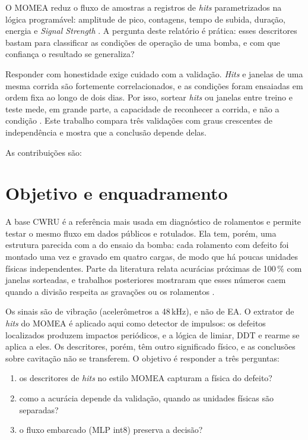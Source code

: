\documentclass[12pt]{article}
\begin{document}
O MOMEA reduz o fluxo de amostras a registros de \textit{hits} parametrizados na lógica programável: amplitude de pico, contagens, tempo de subida, duração, energia e \textit{Signal Strength} \cite{unnthorsson2013,vallen2022}. A pergunta deste relatório é prática: esses descritores bastam para classificar as condições de operação de uma bomba, e com que confiança o resultado se generaliza?

Responder com honestidade exige cuidado com a validação. \textit{Hits} e janelas de uma mesma corrida são fortemente correlacionados, e as condições foram ensaiadas em ordem fixa ao longo de dois dias. Por isso, sortear \textit{hits} ou janelas entre treino e teste mede, em grande parte, a capacidade de reconhecer a corrida, e não a condição \cite{kaufman2012,roberts2017}. Este trabalho compara três validações com graus crescentes de independência e mostra que a conclusão depende delas.

As contribuições são:

\section{Objetivo e enquadramento}
\label{sec:objetivo}


A base CWRU \cite{cwru} é a referência mais usada em diagnóstico de rolamentos e permite testar o mesmo fluxo em dados públicos e rotulados. Ela tem, porém, uma estrutura parecida com a do ensaio da bomba: cada rolamento com defeito foi montado uma vez e gravado em quatro cargas, de modo que há poucas unidades físicas independentes. Parte da literatura relata acurácias próximas de 100\,\% com janelas sorteadas, e trabalhos posteriores mostraram que esses números caem quando a divisão respeita as gravações ou os rolamentos \cite{smith2015,rauber2021,hendriks2022}.

Os sinais são de vibração (acelerômetros a 48\,kHz), e não de EA. O extrator de \textit{hits} do MOMEA é aplicado aqui como detector de impulsos: os defeitos localizados produzem impactos periódicos, e a lógica de limiar, DDT e rearme se aplica a eles. Os descritores, porém, têm outro significado físico, e as conclusões sobre cavitação não se transferem. O objetivo é responder a três perguntas:
\begin{enumerate}
	\item os descritores de \textit{hits} no estilo MOMEA capturam a física do defeito?
	\item como a acurácia depende da validação, quando as unidades físicas são separadas?
	\item o fluxo embarcado (MLP int8) preserva a decisão?
\end{enumerate}
\end{document}
